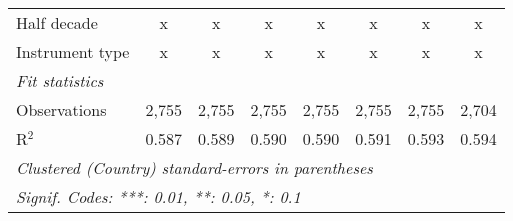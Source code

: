 \begin{tabular}{lccccccc}
   Half decade                                                                              & x       & x            & x             & x            & x            & x              & x\\  
   Instrument type                                                                          & x       & x            & x             & x            & x            & x              & x\\  
   \midrule \emph{Fit statistics}\\
   Observations                                                                             & 2,755   & 2,755        & 2,755         & 2,755        & 2,755        & 2,755          & 2,704\\  
   R$^2$                                                                                    & 0.587   & 0.589        & 0.590         & 0.590        & 0.591        & 0.593          & 0.594\\  
   \midrule
   \multicolumn{8}{l}{\emph{Clustered (Country) standard-errors in parentheses}}\\
   \multicolumn{8}{l}{\emph{Signif. Codes: ***: 0.01, **: 0.05, *: 0.1}}\\
\end{tabular}
\par\endgroup


